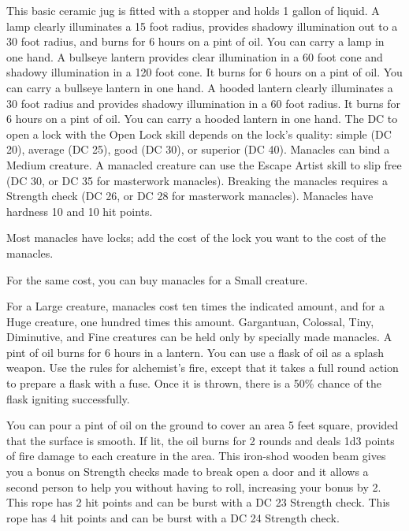  This basic ceramic jug is fitted with a stopper and holds 1 gallon of liquid.
 A lamp clearly illuminates a 15 foot radius, provides shadowy illumination out to a 30 foot radius, and burns for 6 hours on a pint of oil. You can carry a lamp in one hand.
 A bullseye lantern provides clear illumination in a 60 foot cone and shadowy illumination in a 120 foot cone. It burns for 6 hours on a pint of oil. You can carry a bullseye lantern in one hand.
 A hooded lantern clearly illuminates a 30 foot radius and provides shadowy illumination in a 60 foot radius. It burns for 6 hours on a pint of oil. You can carry a hooded lantern in one hand.
 The DC to open a lock with the Open Lock skill depends on the lock's quality: simple (DC 20), average (DC 25), good (DC 30), or superior (DC 40).
 Manacles can bind a Medium creature. A manacled creature can use the Escape Artist skill to slip free (DC 30, or DC 35 for masterwork manacles). Breaking the manacles requires a Strength check (DC 26, or DC 28 for masterwork manacles). Manacles have hardness 10 and 10 hit points.
\par Most manacles have locks; add the cost of the lock you want to the cost of the manacles.
\par For the same cost, you can buy manacles for a Small creature.
\par For a Large creature, manacles cost ten times the indicated amount, and for a Huge creature, one hundred times this amount. Gargantuan, Colossal, Tiny, Diminutive, and Fine creatures can be held only by specially made manacles.
 A pint of oil burns for 6 hours in a lantern. You can use a flask of oil as a splash weapon. Use the rules for alchemist's fire, except that it takes a full round action to prepare a flask with a fuse. Once it is thrown, there is a 50\% chance of the flask igniting successfully.
\par You can pour a pint of oil on the ground to cover an area 5 feet square, provided that the surface is smooth. If lit, the oil burns for 2 rounds and deals 1d3 points of fire damage to each creature in the area.
 This iron-shod wooden beam gives you a  bonus on Strength checks made to break open a door and it allows a second person to help you without having to roll, increasing your bonus by 2.
 This rope has 2 hit points and can be burst with a DC 23 Strength check.
 This rope has 4 hit points and can be burst with a DC 24 Strength check.
